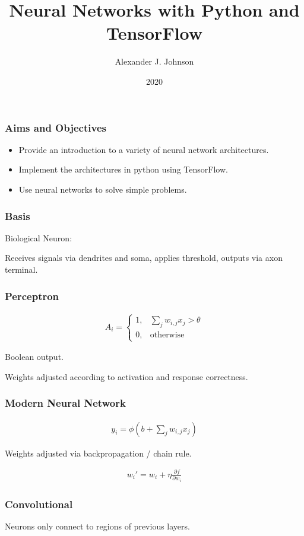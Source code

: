 \documentclass{beamer}
\title{Neural Networks with Python and TensorFlow}
\author{Alexander J. Johnson}
\institute{Manchester Metropolitan University}
\date{2020}
\newlength{\rs}
\begin{document}
\frame{\titlepage}

\begin{frame}
    \frametitle{Aims and Objectives}

    \begin{itemize}
        \item Provide an introduction to a variety of neural network
            architectures.
        \item Implement the architectures in python using TensorFlow.
        \item Use neural networks to solve simple problems.
    \end{itemize}
\end{frame}

\begin{frame}
    \frametitle{Basis}

    Biological Neuron:
    \begin{center}
        
    \end{center}
    Receives signals via dendrites and soma,
    applies threshold,
    outputs via axon terminal.
\end{frame}

\begin{frame}
    \frametitle{Perceptron}
    
    \begin{align*}
        A_i = \begin{cases}
            1, & \sum_j w_{i,j}x_j > \theta\\
            0, & \text{otherwise}
        \end{cases}
    \end{align*}

    Boolean output.

    Weights adjusted according to activation and response correctness.
\end{frame}

\begin{frame}
    \frametitle{Modern Neural Network}
    
    \begin{align*}
        y_i = \phi \left(b + \sum_j w_{i,j}x_j\right)
    \end{align*}

    Weights adjusted via backpropagation / chain rule.

    \begin{align*}
        w_i' = w_i + \eta\frac{\partial f}{\partial w_i}
    \end{align*}
\end{frame}

\begin{frame}
    \frametitle{Convolutional}
    
    Neurons only connect to regions of previous layers.
\end{frame}
\end{document}
